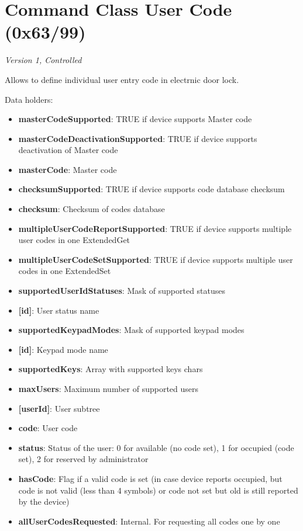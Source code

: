 \section{Command Class User Code (0x63/99)}

\textit{Version 1, Controlled}
\newline

Allows to define individual user entry code in electrnic door lock.
\newline

\noindent
Data holders:

\begin{itemize}
\item \textbf{masterCodeSupported}: TRUE if device supports Master code
\item \textbf{masterCodeDeactivationSupported}: TRUE if device supports deactivation of Master code
\item \textbf{masterCode}: Master code
\item \textbf{checksumSupported}: TRUE if device supports code database checksum
\item \textbf{checksum}: Checksum of codes database
\item \textbf{multipleUserCodeReportSupported}: TRUE if device supports multiple user codes in one ExtendedGet
\item \textbf{multipleUserCodeSetSupported}: TRUE if device supports multiple user codes in one ExtendedSet
\item \textbf{supportedUserIdStatuses}: Mask of supported statuses
\item \qquad\textbf{[id]}: User status name
\item \textbf{supportedKeypadModes}: Mask of supported keypad modes
\item \qquad\textbf{[id]}: Keypad mode name
\item \textbf{supportedKeys}: Array with supported keys chars
\item \textbf{maxUsers}: Maximum number of supported users
\item \textbf{[userId]}: User subtree
\item \qquad\textbf{code}: User code
\item \qquad\textbf{status}: Status of the user: 0 for available (no code set), 1 for occupied (code set), 2 for reserved by administrator
\item \qquad\textbf{hasCode}: Flag if a valid code is set (in case device reports occupied, but code is not valid (less than 4 symbols) or code not set but old is still reported by the device)
\item \textbf{allUserCodesRequested}: Internal. For requesting all codes one by one
\end{itemize}

